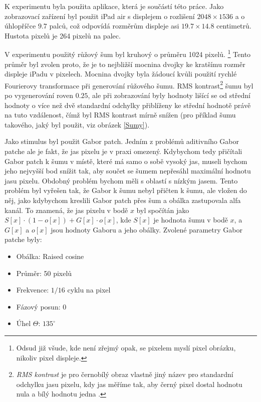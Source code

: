 K experimentu byla použita aplikace, která je součástí této práce. 
Jako zobrazovací zařízení byl použit iPad air s displejem o rozlišení
$2048\times1536$ a o úhlopříčce $9.7$ palců, což odpovídá rozměrům displeje asi
$19.7 \times 14.8$ centimetrů. Hustota pixelů je 264 pixelů na palec. 

V experimentu použitý růžový šum byl kruhový o průměru 1024 pixelů.
\footnote{Odsud již všude, kde není zřejmý opak, se pixelem myslí
pixel obrázku, nikoliv pixel displeje.} Tento průměr byl zvolen proto, že je
to nejbližší mocnina dvojky ke kratšímu rozměr displeje iPadu v pixelech.
Mocnina dvojky byla žádoucí kvůli použití rychlé Fourierovy transformace při
generování růžového šumu. RMS kontrast\footnote{{\it RMS kontrast} je pro
černobílý obraz vlastně jiný název pro standardní odchylku jasu pixelu, kdy jas
měříme tak, aby černý pixel dostal hodnotu nula a bílý hodnotu jedna
\citep{RMS}.} šumu byl po vygenerování roven $0.25$, ale při zobrazování byly
hodnoty lišící se od střední hodnoty o více než dvě standardní odchylky
přiblíženy ke střední hodnotě právě na tuto vzdálenost, čímž byl RMS kontrast
mírně snížen (pro příklad šumu takového, jaký byl použit, viz obrázek \ref{Sumy}). 

Jako stimulus byl použit Gabor patch. Jedním z problémů aditivního Gabor patche
ale je fakt, že jas pixelu je v praxi omezený. Kdybychom tedy přičítali Gabor
patch k šumu v místě, které má samo o sobě vysoký jas, museli bychom jeho nejvyšší
bod snížit tak, aby součet se šumem nepřesáhl maximální hodnotu jasu pixelu.
Obdobný problém bychom měli s oblastí s nízkým jasem. Tento problém byl vyřešen
tak, že Gabor k šumu nebyl přičten k šumu, ale vložen do něj, jako
kdybychom kreslili Gabor patch přes šum a obálka zastupovala alfa kanál. To
znamená, že jas pixelu v bodě $x$ byl spočítán jako $S[x] \cdot (1-o[x]) +
G[x]\cdot o[x]$, kde $S[x]$ je hodnota šumu v bodě $x$, a $G[x]$ a $o[x]$ jsou
hodnoty Gaboru a jeho obálky.  Zvolené parametry Gabor patche byly:

\begin{itemize}
\item Obálka: Raised cosine
\item Průměr: 50 pixelů
\item Frekvence: $1/16$ cyklu na pixel
\item Fázový posun: 0
\item Úhel $\Theta$: $135^\circ$ 
\end{itemize}

